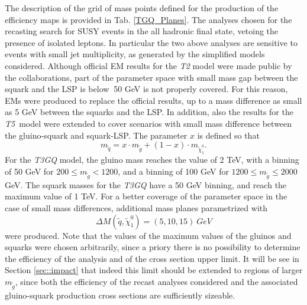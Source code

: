 \documentclass[a4paper,11pt]{article}
\newcommand{\MGLU}{$ m _{ \tilde g } $\xspace}
\newcommand{\Tfive}{ \textit{T5}}
\begin{document}
%
The description of the grid of mass points defined for the production of the efficiency maps is provided in Tab. \ref{TGQ_Planes}. The analyses chosen for the recasting search for SUSY events in the all hadronic final state, vetoing the presence of isolated leptons. In particular the two above analyses are sensitive to events with small jet multiplicity, as generated by the simplified models considered. Although official EM results for the \textit{T2} model were made public by the collaborations, part of the parameter space with small mass gap between the squark and the LSP is below $~$50 GeV is not properly covered. For this reason, EMs were produced to replace the official results, up to a mass difference as small as 5 GeV between the squarks and the LSP. In addition, also the results for the \Tfive~model were extended to cover scenarios with small mass difference between the gluino-squark and squark-LSP. The parameter $x$ is defined so that
\begin{equation}
m_{\tilde q}= x\cdot m_{\tilde g} + (1-x)\cdot m_{\tilde \chi_1 ^0}.
\end{equation}
%
For the \textit{T3GQ} model, the gluino mass reaches the value of 2 TeV, with a binning of 50 GeV for $200 \leq m_{\tilde g} < 1200$, and a binning of 100 GeV for $1200 \leq m_{\tilde g}  \leq 2000$ GeV. The squark masses for the \textit{T3GQ} have a 50 GeV binning, and reach the maximum value of 1 TeV. For a better coverage of the parameter space in the case of small mass differences, additional mass planes parametrized with 
\begin{equation}
\Delta M ( \tilde q, \tilde \chi _1 ^0)=(5,10,15) \ GeV
\end{equation}
were produced. Note that the values of the maximum values of the gluinos and squarks were chosen arbitrarily, since a priory there is no possibility to determine the efficiency of the analysis and of the cross section upper limit. It will be see in Section \ref{sec::impact} that indeed this limit should be extended to regions of larger \MGLU, since both the efficiency of the recast analyses considered and the associated gluino-squark production cross sections are sufficiently sizeable.
%
\end{document}
